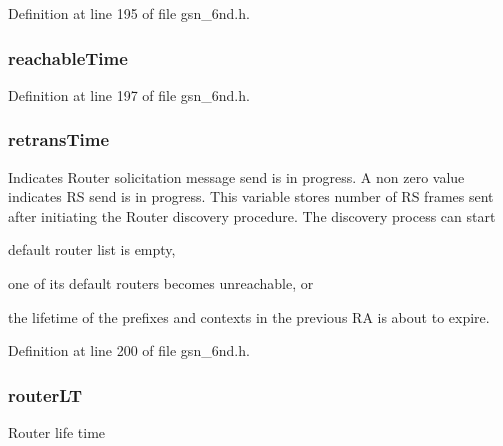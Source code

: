 Definition at line 195 of file gsn\_\-6nd.h.

\hypertarget{a00194_ada91f88c6f6c12258e42ca2ef41ab99a}{
\subsubsection[{reachableTime}]{ {\bf reachableTime}}}
\label{a00194_ada91f88c6f6c12258e42ca2ef41ab99a}


Definition at line 197 of file gsn\_\-6nd.h.

\hypertarget{a00194_a0befa25d646d3b1ef627c7b94d5a4918}{
\subsubsection[{retransTime}]{ {\bf retransTime}}}
\label{a00194_a0befa25d646d3b1ef627c7b94d5a4918}
Indicates Router solicitation message send is in progress. A non zero value indicates RS send is in progress. This variable stores number of RS frames sent after initiating the Router discovery procedure. The discovery process can start
\begin{DoxyItemize}
\item default router list is empty,
\item one of its default routers becomes unreachable, or
\item the lifetime of the prefixes and contexts in the previous RA is about to expire. 
\end{DoxyItemize}

Definition at line 200 of file gsn\_\-6nd.h.

\hypertarget{a00194_afe72ac8c2aed197cadba13da2b74c4ee}{
\subsubsection[{routerLT}]{ {\bf routerLT}}}
\label{a00194_afe72ac8c2aed197cadba13da2b74c4ee}
Router life time 

